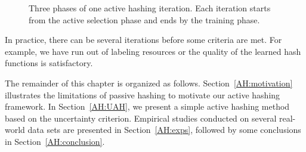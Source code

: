 \begin{figure}[htb]
\centering
\caption{Three phases of one active hashing iteration. Each iteration starts from the active selection phase and ends by the training phase.}
\label{fig:ah:ah}
\end{figure}



In practice, there can be several iterations before some criteria are met. For example, we have run out of labeling resources or the quality of the learned hash functions is satisfactory.


The remainder of this chapter is organized as follows. Section~\ref{AH:motivation} illustrates the limitations of passive hashing to motivate our active hashing framework. In Section~\ref{AH:UAH}, we present a simple active hashing method based on the uncertainty criterion. Empirical studies conducted on several real-world data sets are presented in Section~\ref{AH:exps}, followed by some conclusions in Section~\ref{AH:conclusion}.

